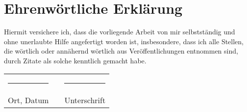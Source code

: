 \thispagestyle{empty}
\section*{Ehrenwörtliche Erklärung}
Hiermit versichere ich, dass die vorliegende Arbeit von mir selbstständig
und ohne unerlaubte Hilfe angefertigt worden ist, insbesondere, dass ich
alle Stellen, die wörtlich oder annähernd wörtlich aus Veröffentlichungen
entnommen sind, durch Zitate als solche kenntlich gemacht habe.

\begin{tabular}{lcl}
    \rule{6cm}{1pt} & \hspace{2cm} & \rule{6cm}{1pt} \\
    Ort, Datum & & Unterschrift
\end{tabular}